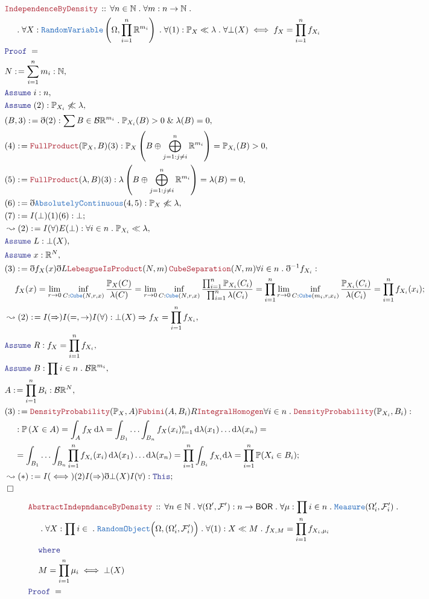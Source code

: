 \documentclass[12pt]{scrartcl}
\newcommand{\TYPE}[1]{\textcolor{NavyBlue}{\mathtt{#1}}}
\newcommand{\LOGIC}[1]{\textcolor{Blue}{\mathtt{#1}}}
\newcommand{\THM}[1]{\textcolor{Maroon}{\mathtt{#1}}}
\renewcommand{\.}{\; . \;}
\newcommand{\de}{: \kern 0.1pc =}
\newcommand{\Theorem}[2]{& \THM{#1} \, :: \, #2 \\ & \Proof = \\ }
\newcommand{\NewLine}{\\ & \kern 1pc}
\newcommand{\Page}[1]{\begin{align*} #1 \end{align*}   }
\newcommand{ \bd }{ \ByDef }
\renewcommand{\And}{\; \& \;}
\newcommand{\Reals}{\mathbb{R} }
\newcommand{\Nat}{\mathbb{N} }
\newcommand{\Say}[3]{& #1 \de #2 : #3, \\}
\newcommand{\Conclude}[3]{& #1 \de #2 : #3; \\}
\newcommand{\Derive}[3]{& \leadsto #1 \de #2 : #3, \\}
\newcommand{\DeriveConclude}[3]{& \leadsto #1 \de #2 : #3 ; \\}
\newcommand{\A}{\LOGIC{Assume} \;}
\newcommand{\Assume}[2]{& \A #1 : #2, \\}
\newcommand{\QED}{\; \square}
\newcommand{\EndProof}{& \QED \\}
\newcommand{\ByDef}{\eth}
\newcommand{\Proof}{\LOGIC{Proof} \; }
\renewcommand{\AC}{\TYPE{AbsolutelyContinuous}}
\newcommand{\BOR}{\mathsf{BOR}}
\newcommand{\F}{\mathcal{F}}
\renewcommand{\O}{\Omega}
\newcommand{\B}{\mathcal{B}}
\renewcommand{\l}{\lambda}
\renewcommand{\P}{\mathbb{P}}
\newcommand{\RV}{\TYPE{RandomVariable}}
\newcommand{\RO}{\TYPE{RandomObject}}
\begin{document}
\Page{
	\Theorem{IndependenceByDensity}{
		\forall n \in \Nat \. \forall m : n \to \Nat \. 
		\NewLine
		\. \forall X : \RV\left(\O, \prod^n_{i = 1} \Reals^{m_i} \right) \.  \forall (1) : \P_X \ll \l \. 
		\forall \bot(X) \iff f_{X} = \prod^n_{i = 1} f_{X_i}
	}
	\Say{N}{\sum^n_{i=1} m_i}{\Nat}
	\Assume{i}{n}
	\Assume{(2)}{\P_{X_i} \not \ll \l}
	\Say{(B,3)}{\bd (2)}{\sum B \in \B \Reals^{m_i} \. \P_{X_i}(B) > 0 \And \l(B) = 0}
	\Say{(4)}{\THM{FullProduct}(\P_X,B)(3)}{ \P_X \left( B \oplus \bigoplus^{n}_{j = 1 : j \neq i} \Reals^{m_i} \right) = \P_{X_i}(B) > 0 }
	\Say{(5)}{\THM{FullProduct}(\l,B)(3)}{ \l \left( B \oplus \bigoplus^{n}_{j = 1 : j \neq i} \Reals^{m_i} \right) = \l(B) = 0 }
	\Say{(6)}{ \bd \AC (4,5)}{\P_X \not \ll \l}
	\Conclude{(7)}{I(\bot)(1)(6)}{\bot}
	\Derive{(2)}{I(\forall)E(\bot)}{\forall i \in n \. \P_{X_i} \ll \l}
	\Assume{ L   }{ \bot(X)  }
	\Assume{x}{ \Reals^N}
	\Conclude{(3)}{\bd f_X(x) \bd L \THM{LebesgueIsProduct}(N,m) \, \THM{CubeSeparation}(N,m) \forall i \in n \. \bd^{-1} f_{X_i}}
	{	
		\NewLine
		f_X(x) =  
		\lim_{r \to 0} \inf_{C : \TYPE{Cube}(N,r,x)}  \frac{\P_X(C)}{\l(C)} = 
		\lim_{r \to 0} \inf_{C : \TYPE{Cube}(N,r,x)} \frac{\prod^n_{i = 1} \P_{X_i}(C_i)}{\prod^n_{i = 1}\l(C_i)}  =
		\prod^{n}_{i = 1}\lim_{r \to 0 } \inf_{C : \TYPE{Cube}(m_i,r,x_i)} \frac{\P_{X_i}(C_i)}{\l(C_i)} =
		\prod^{n}_{i = 1} f_{X_i}(x_i)
	}
	\Derive{(2)}{I(\Rightarrow)I(=,\to)I(\forall)}{ \bot(X) \Rightarrow f_X = \prod^n_{i = 1} f_{X_i}   }
	\Assume{R}{ f_X = \prod^n_{i=1} f_{X_i}}
	\Assume{B}{\prod i \in n \. \B \Reals^{m_i}}
	\Say{A}{\prod^n_{i=1} B_i}{\B \Reals^N}
	\Conclude{(3)}{
		\THM{DensityProbability}(\P_X,A)
		\THM{Fubini}(A,B_i)
		R
		\THM{IntegralHomogen}
		\forall i \in n \. \THM{DensityProbability}(\P_{X_i},B_i)
	}{ 
		\NewLine :
		\P\left(X \in A \right) = 
		\int_A f_X \, \mathrm{d}\l = 
		\int_{B_1} \ldots \int_{B_n} f_X(x_i)^n_{i=1} \, \mathrm{d}\l(x_1)\ldots \mathrm{d}\l(x_n) =
		\NewLine =
		\int_{B_1} \ldots \int_{B_n} \prod^n_{i=1} f_{X_i}(x_i) \, \mathrm{d}\l(x_1) \ldots \mathrm{d}\l(x_n) =
		\prod^n_{i=1} \int_{B_i} f_{X_i} \mathrm{d} \l= 
		\prod^n_{i = 1} \P(X_i \in B_i)
	}
	\DeriveConclude{(*)}{I(\iff)(2)I(\Rightarrow)\bd \bot(X) I(\forall)}{\LOGIC{This}}
	\EndProof
}\Page{
	\Theorem{AbstractIndepndanceByDensity}{\forall n \in \Nat \. \forall (\O',\F') : n \to \BOR \. \forall \mu : \prod i \in n \. \TYPE{Measure}(\O'_i,\F'_i)\.
	  \NewLine \.
	  \forall X : \prod i \in \. \RO\Big(\O ,(\O'_i,\F'_i) \Big) \. \forall (1) : X \ll M \. f_{X,M} = \prod^n_{i=1} f_{X_i,\mu_i} \NewLine 
	  \LOGIC{where}
	  \NewLine
	  M = \prod^n_{i=1} \mu_i \iff \bot(X)
}}
\end{document}

